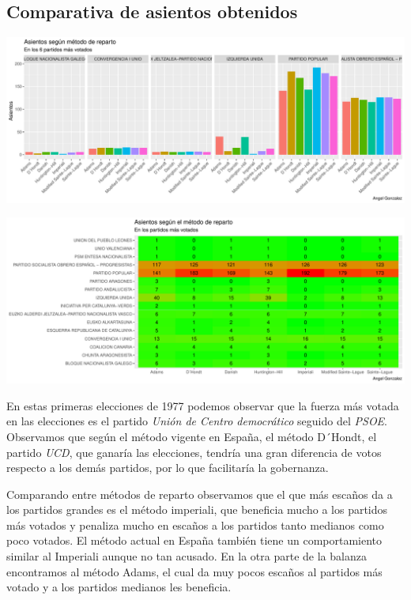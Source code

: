 \documentclass[12pt,a4paper,]{book}
\numberwithin{dummy}{section}
\theoremstyle{ocrenumbox}
\theoremstyle{blacknumex}
\theoremstyle{blacknumbox}
\theoremstyle{ocrenum}
\theoremstyle{ocrenum}
\begin{document}
\hypertarget{comparativa-de-asientos-obtenidos}{%
\subsection{Comparativa de asientos
obtenidos}\label{comparativa-de-asientos-obtenidos}}

\begin{center}\includegraphics[width=1\linewidth]{figurasR/unnamed-chunk-73-1} \end{center}

\begin{center}\includegraphics[width=1\linewidth]{figurasR/unnamed-chunk-73-2} \end{center}

En estas primeras elecciones de 1977 podemos observar que la fuerza más
votada en las elecciones es el partido \emph{Unión de Centro
democrático} seguido del \emph{PSOE}. Observamos que según el método
vigente en España, el método D´Hondt, el partido \emph{UCD}, que ganaría
las elecciones, tendría una gran diferencia de votos respecto a los
demás partidos, por lo que facilitaría la gobernanza.

Comparando entre métodos de reparto observamos que el que más escaños da
a los partidos grandes es el método imperiali, que beneficia mucho a los
partidos más votados y penaliza mucho en escaños a los partidos tanto
medianos como poco votados. El método actual en España también tiene un
comportamiento similar al Imperiali aunque no tan acusado. En la otra
parte de la balanza encontramos al método Adams, el cual da muy pocos
escaños al partidos más votado y a los partidos medianos les beneficia.
\end{document}
